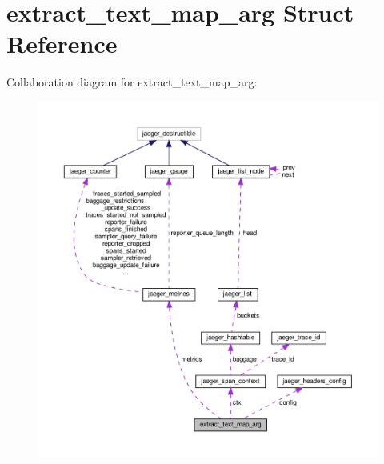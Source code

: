 \hypertarget{structextract__text__map__arg}{}\section{extract\+\_\+text\+\_\+map\+\_\+arg Struct Reference}
\label{structextract__text__map__arg}


Collaboration diagram for extract\+\_\+text\+\_\+map\+\_\+arg\+:\nopagebreak
\begin{figure}[H]
\begin{center}
\leavevmode
\includegraphics[width=350pt]{structextract__text__map__arg__coll__graph}
\end{center}
\end{figure}
